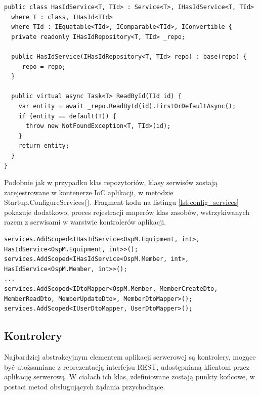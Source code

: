 \begin{lstlisting}[language=CSharp, caption=Generyczna klasa serwisu operującego na encjach zasobów posiadających klucz główny, label=lst:service_id]
public class HasIdService<T, TId> : Service<T>, IHasIdService<T, TId>
  where T : class, IHasId<TId>
  where TId : IEquatable<TId>, IComparable<TId>, IConvertible {
  private readonly IHasIdRepository<T, TId> _repo;

  public HasIdService(IHasIdRepository<T, TId> repo) : base(repo) {
    _repo = repo;
  }

  public virtual async Task<T> ReadById(TId id) {
    var entity = await _repo.ReadById(id).FirstOrDefaultAsync();
    if (entity == default(T)) {
      throw new NotFoundException<T, TId>(id);
    }
    return entity;
  }
}
\end{lstlisting}

Podobnie jak w przypadku klas repozytoriów, klasy serwisów zostają zarejestrowane w kontenerze IoC aplikacji, w metodzie Startup.ConfigureServices(). Fragment kodu na listingu \ref{lst:config_services} pokazuje dodatkowo, proces rejestracji maperów klas zasobów, wstrzykiwanych razem z serwisami w warstwie kontrolerów aplikacji.

\begin{lstlisting}[language=CSharp, caption={Fragment metody Startup.ConfigureServices(), rejestrujący przykładowe klasy serwisów oraz maperów klas zasobów, w kontenerze IoC}, label=lst:config_services]
services.AddScoped<IHasIdService<OspM.Equipment, int>, HasIdService<OspM.Equipment, int>>();
services.AddScoped<IHasIdService<OspM.Member, int>, HasIdService<OspM.Member, int>>();
...
services.AddScoped<IDtoMapper<OspM.Member, MemberCreateDto, MemberReadDto, MemberUpdateDto>, MemberDtoMapper>();
services.AddScoped<IUserDtoMapper, UserDtoMapper>();
\end{lstlisting}

\subsection{Kontrolery}

Najbardziej abstrakcyjnym elementem aplikacji serwerowej są kontrolery, mogące być utożsamiane z reprezentacją interfejsu REST, udostępnianą klientom przez aplikację serwerową. W ciałach ich klas, zdefiniowane zostają punkty końcowe, w postaci metod obsługujących żądania przychodzące.


